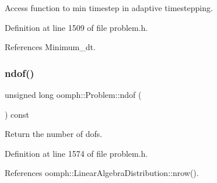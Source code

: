 Access function to min timestep in adaptive timestepping. 



Definition at line 1509 of file problem.\+h.



References Minimum\+\_\+dt.

\mbox{\label{classoomph_1_1Problem_a218d4dfff74bc14f3f5dc8416236e01d}} 
\subsubsection{\texorpdfstring{ndof()}{ndof()}}
{\footnotesize\ttfamily unsigned long oomph\+::\+Problem\+::ndof (\begin{DoxyParamCaption}{ }\end{DoxyParamCaption}) const\hspace{0.3cm}{\ttfamily [inline]}}



Return the number of dofs. 



Definition at line 1574 of file problem.\+h.



References oomph\+::\+Linear\+Algebra\+Distribution\+::nrow().



